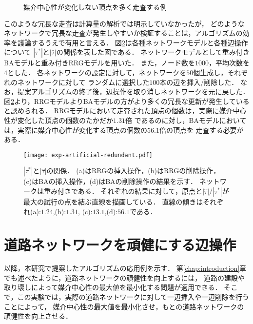 \begin{figure}[tb]
  \centering
  \def\svgwidth{.8\linewidth}
  
  \caption{媒介中心性が変化しない頂点を多く走査する例}
  \label{fig:redundant-traverse-many}
\end{figure}

このような冗長な走査は計算量の解析では明示していなかったが，
どのようなネットワークで冗長な走査が発生しやすいか検証することは，アルゴリズムの効率を議論するうえで有用と言える．
図\ref{fig:exp-artificial-redundant}は各種ネットワークモデルと各種辺操作について
$|\tau^\ast|$と$|\hat{\tau}|$の関係を表した図である．
ネットワークモデルとして重み付きBAモデルと重み付きRRGモデルを用いた．
また，ノード数を$1000$，平均次数を$4$とした．
各ネットワークの設定に対して，ネットワークを$50$個生成し，それぞれのネットワークに対して
ランダムに選択した$100$本の辺を挿入/削除した．
なお，提案アルゴリズムの終了後，辺操作を取り消しネットワークを元に戻した．
図\ref{fig:exp-artificial-redundant}より，RRGモデルよりBAモデルの方がより多くの冗長な更新が発生していると認められる．
RRGモデルにおいて走査された頂点の個数は，実際に媒介中心性が変化した頂点の個数のたかだか$1.31$倍
であるのに対し，BAモデルにおいては，実際に媒介中心性が変化する頂点の個数の$56.1$倍の頂点を
走査する必要がある．

\begin{figure}
  \centering
  \texttt{[image: exp-artificial-redundant.pdf]}
  \caption{
    $|\tau^\ast|$と$|\hat{\tau}|$の関係．
    (a)はRRGの挿入操作，(b)はRRGの削除操作，
    (c)はBAの挿入操作，(d)はBAの削除操作の結果を示す．
    ネットワークは重み付きである．
    それぞれの結果に対して，原点と$|\hat{\tau}|/|\tau^\ast|$が
    最大の試行の点を結ぶ直線を描画している．
    直線の傾きはそれぞれ(a):$1.24$,(b):$1.31$,
    (c):$13.1$,(d):$56.1$である．
  }
  \label{fig:exp-artificial-redundant}
\end{figure}

\section{道路ネットワークを頑健にする辺操作}

以降，本研究で提案したアルゴリズムの応用例を示す．
第\ref{chap:introduction}章でも述べたように，道路ネットワークの頑健性を向上するには，
道路の建設や取り壊しによって媒介中心性の最大値を最小化する問題が適用できる．
そこで，この実験では，実際の道路ネットワークに対して一辺挿入や一辺削除を行うことによって，
媒介中心性の最大値を最小化させ，もとの道路ネットワークの頑健性を向上させる．

